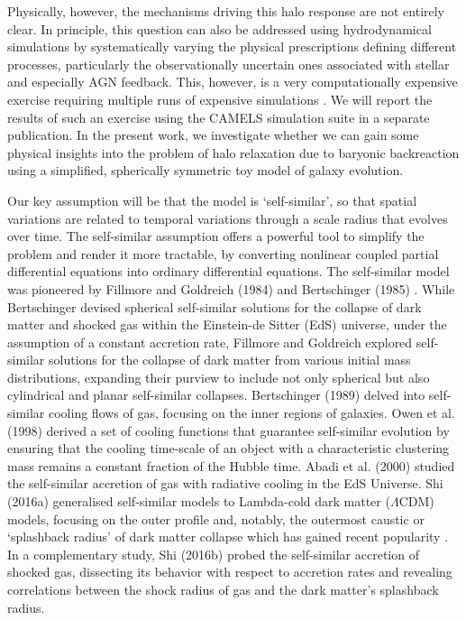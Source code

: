 \documentclass[a4paper, 12pt, oneside]{Thesis}  %
\begin{document}
Physically, however, the mechanisms driving this halo response are not entirely clear. In principle, this question can also be addressed using hydrodynamical simulations by systematically varying the physical prescriptions defining different processes, particularly the observationally uncertain ones associated with stellar and especially AGN feedback. This, however, is a very computationally expensive exercise requiring multiple runs of expensive simulations \cite{2015Schaye_EAGLE,2021camels_presentation}.
We will report the results of such an exercise using the CAMELS simulation suite \cite{2022camels_data_release1} in a separate publication. In the present work, we investigate whether we can gain some physical insights into the problem of halo relaxation due to baryonic backreaction using a simplified, spherically symmetric toy model of galaxy evolution.

Our key assumption will be that the model is `self-similar', so that spatial variations are related to temporal variations through a scale radius that evolves over time. The self-similar assumption offers a powerful tool to simplify the problem and render it more tractable, by converting nonlinear coupled partial differential equations into ordinary differential equations. The self-similar model was pioneered by Fillmore and Goldreich (1984) \cite{1984FillmoreGoldreich} and Bertschinger (1985) \cite{1985Bertschinger}. While Bertschinger devised spherical self-similar solutions for the collapse of dark matter and shocked gas within the Einstein-de Sitter (EdS) universe, under the assumption of a constant accretion rate, Fillmore and Goldreich explored self-similar solutions for the collapse of dark matter from various initial mass distributions, expanding their purview to include not only spherical but also cylindrical and planar self-similar collapses. Bertschinger (1989) \cite{1989Bertschinger} delved into self-similar cooling flows of gas, focusing on the inner regions of galaxies. Owen et al. (1998) \cite{1998OwenWeinberg_etal} derived a set of cooling functions that guarantee self-similar evolution by ensuring that the cooling time-scale of an object with a characteristic clustering mass remains a constant fraction of the Hubble time. Abadi et al. (2000) \cite{2000Abadi_etal_SelfSimCool} studied the self-similar accretion of gas with radiative cooling in the EdS Universe. Shi (2016a) \cite{2016ShiDMLamCDM} generalised self-similar models to Lambda-cold dark matter ($\Lambda$CDM) models, focusing on the outer profile and, notably, the outermost caustic or `splashback radius' of dark matter collapse which has gained recent popularity \cite{2014DiemerKrastov,2014AdhikariDalalChamberlain,2018Changetal_DES_splashback}.
In a complementary study, Shi (2016b) \cite{2016ShiICM} probed the self-similar accretion of shocked gas, dissecting its behavior with respect to accretion rates and revealing correlations between the shock radius of gas and the dark matter's splashback radius.
\end{document}
